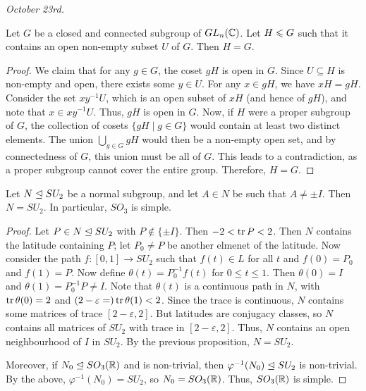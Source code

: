 \textit{October 23rd.}

\begin{proposition}
    Let $G$ be a closed and connected subgroup of $GL_{n}(\mathbb{C})$. Let $H \leqslant G$ such that it contains an open non-empty subset $U$ of $G$. Then $H = G$.
\end{proposition}
\begin{proof}
    We claim that for any $g \in G$, the coset $gH$ is open in $G$. Since $U \subseteq H$ is non-empty and open, there exists some $y \in U$. For any $x \in gH$, we have $xH = gH$. Consider the set $xy^{-1}U$, which is an open subset of $xH$ (and hence of $gH$), and note that $x \in xy^{-1}U$. Thus, $gH$ is open in $G$. 
    Now, if $H$ were a proper subgroup of $G$, the collection of cosets $\{ gH \mid g \in G \}$ would contain at least two distinct elements. The union $\bigcup_{g \in G} gH$ would then be a non-empty open set, and by connectedness of $G$, this union must be all of $G$. This leads to a contradiction, as a proper subgroup cannot cover the entire group. Therefore, $H = G$.
\end{proof}

\begin{theorem}
    Let $N \trianglelefteq SU_{2}$ be a normal subgroup, and let $A \in N$ be such that $A \neq \pm I$. Then $N = SU_{2}$. In particular, $SO_{3}$ is simple.
\end{theorem}

\begin{proof}
    Let $P \in N \trianglelefteq SU_{2}$ with $P \notin \{\pm I\}$. Then $-2 < \operatorname{tr} P < 2$. Then $N$ contains the latitude containing $P$; let $P_{0} \neq P$ be another elmenet of the latitude. Now consider the path $f:[0,1] \to SU_{2}$ such that $f(t) \in L$ for all $t$ and $f(0) = P_{0}$ and $f(1) = P$. Now define $\theta(t) = P_{0}^{-1}f(t)$ for $0 \leq t \leq 1$. Then $\theta(0) = I$ and $\theta(1) = P_{0}^{-1}P \neq I$. Note that $\theta(t)$ is a continuous path in $N$, with $\operatorname{tr} \theta(0) = 2$ and $(2-\varepsilon = ) \operatorname{tr} \theta(1) < 2$. Since the trace is continuous, $N$ contains some matrices of trace $[2-\varepsilon,2]$. But latitudes are conjugacy classes, so $N$ contains all matrices of $SU_{2}$ with trace in $[2-\varepsilon,2]$. Thus, $N$ contains an open neighbourhood of $I$ in $SU_{2}$. By the previous proposition, $N = SU_{2}$.

    Moreover, if $N_{0} \trianglelefteq SO_{3}(\mathbb{R})$ and is non-trivial, then $\varphi^{-1}(N_{0}) \trianglelefteq SU_{2}$ is non-trivial. By the above, $\varphi^{-1}(N_{0}) = SU_{2}$, so $N_{0} = SO_{3}(\mathbb{R})$. Thus, $SO_{3}(\mathbb{R})$ is simple.
\end{proof}

